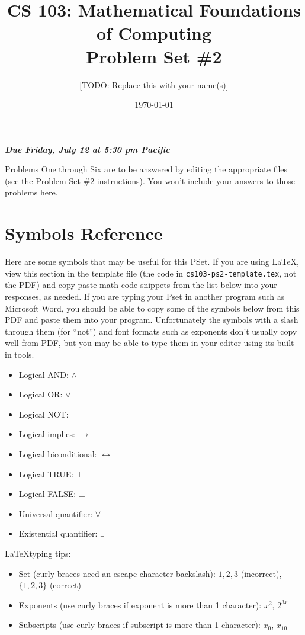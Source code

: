 \documentclass{article}
\title{CS 103: Mathematical Foundations of Computing\\Problem Set \#2}
\author{[TODO: Replace this with your name(s)]}
\date{\today}
\renewcommand{\(}{\left(}
\renewcommand{\)}{\right)}
\renewcommand{\emph}[1]{\textit{\textbf{#1}}}
\theoremstyle{plain}
\theoremstyle{plain}
\theoremstyle{definition}
\begin{document}
\maketitle

\begin{center}
  \emph{Due Friday, July 12 at 5:30 pm Pacific}
\end{center}

\vspace{1cm}

Problems One through Six are to be answered by editing the appropriate files (see the Problem Set \#2 instructions). You won't include your answers to those problems here.

\section*{Symbols Reference}
Here are some symbols that may be useful for this PSet. If you are using \LaTeX, view this section in the template file (the code in \texttt{cs103-ps2-template.tex}, not the PDF) and copy-paste math code snippets from the list below into your responses, as needed. If you are typing your Pset in another program such as Microsoft Word, you should be able to copy some of the symbols below from this PDF and paste them into your program. Unfortunately the symbols with a slash through them (for ``not'') and font formats such as exponents don't usually copy well from PDF, but you may be able to type them in your editor using its built-in tools.
\begin{itemize}
    \item Logical AND: $\land$
    \item Logical OR: $\lor$
    \item Logical NOT: $\lnot$
    \item Logical implies: $\to$
    \item Logical biconditional: $\leftrightarrow$
    \item Logical TRUE: $\top$
    \item Logical FALSE: $\bot$
    \item Universal quantifier: $\forall$
    \item Existential quantifier: $\exists$
\end{itemize}

\LaTeX typing tips:
\begin{itemize}
    \item Set (curly braces need an escape character backslash): ${1, 2, 3}$ (incorrect), $\{1, 2, 3\}$ (correct)
    \item Exponents (use curly braces if exponent is more than 1 character): $x^2$, $2^{3x}$
    \item Subscripts (use curly braces if subscript is more than 1 character): $x_0$, $x_{10}$
\end{itemize}
    
\end{document}
